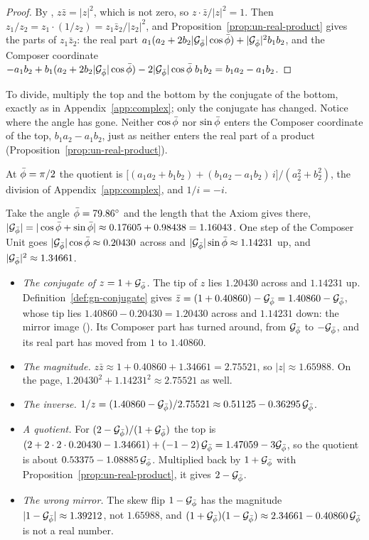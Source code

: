 \begin{proof}
By , $z\bar{z} = |z|^2$, which is not zero, so $z \cdot \bar{z}/|z|^2 = 1$. Then $z_1/z_2 = z_1 \cdot (1/z_2) = z_1\bar{z}_2/|z_2|^2$, and Proposition~\ref{prop:un-real-product} gives the parts of $z_1\bar{z}_2$: the real part $a_1(a_2 + 2b_2|\mathcal{G}_{\bar{\phi}}|\cos\bar{\phi}) + |\mathcal{G}_{\bar{\phi}}|^2 b_1 b_2$, and the Composer coordinate $-a_1b_2 + b_1(a_2 + 2b_2|\mathcal{G}_{\bar{\phi}}|\cos\bar{\phi}) - 2|\mathcal{G}_{\bar{\phi}}|\cos\bar{\phi}\; b_1b_2 = b_1a_2 - a_1b_2$.
\end{proof}

\begin{plainwords}
To divide, multiply the top and the bottom by the conjugate of the bottom, exactly as in Appendix~\ref{app:complex}; only the conjugate has changed. Notice where the angle has gone. Neither $\cos\bar{\phi}$ nor $\sin\bar{\phi}$ enters the Composer coordinate of the top, $b_1a_2 - a_1b_2$, just as neither enters the real part of a product (Proposition~\ref{prop:un-real-product}).
\end{plainwords}

\incomplex At $\bar{\phi} = \pi/2$ the quotient is $\bigl[(a_1a_2 + b_1b_2) + (b_1a_2 - a_1b_2)\,i\bigr]/(a_2^2 + b_2^2)$, the division of Appendix~\ref{app:complex}, and $1/i = -i$.

\begin{workedexample}
Take the angle $\bar{\phi} = 79.86^\circ$ and the length that the Axiom gives there, $|\mathcal{G}_{\bar{\phi}}| = |\cos\bar{\phi} + \sin\bar{\phi}| \approx 0.17605 + 0.98438 = 1.16043$. One step of the Composer Unit goes $|\mathcal{G}_{\bar{\phi}}|\cos\bar{\phi} \approx 0.20430$ across and $|\mathcal{G}_{\bar{\phi}}|\sin\bar{\phi} \approx 1.14231$ up, and $|\mathcal{G}_{\bar{\phi}}|^2 \approx 1.34661$.
\begin{itemize}
  \item \emph{The conjugate of $z = 1 + \mathcal{G}_{\bar{\phi}}$.} The tip of $z$ lies $1.20430$ across and $1.14231$ up. Definition~\ref{def:gn-conjugate} gives $\bar{z} = (1 + 0.40860) - \mathcal{G}_{\bar{\phi}} = 1.40860 - \mathcal{G}_{\bar{\phi}}$, whose tip lies $1.40860 - 0.20430 = 1.20430$ across and $1.14231$ down: the mirror image (). Its Composer part has turned around, from $\mathcal{G}_{\bar{\phi}}$ to $-\mathcal{G}_{\bar{\phi}}$, and its real part has moved from $1$ to $1.40860$.
  \item \emph{The magnitude.} $z\bar{z} \approx 1 + 0.40860 + 1.34661 = 2.75521$, so $|z| \approx 1.65988$. On the page, $1.20430^2 + 1.14231^2 \approx 2.75521$ as well.
  \item \emph{The inverse.} $1/z = (1.40860 - \mathcal{G}_{\bar{\phi}})/2.75521 \approx 0.51125 - 0.36295\,\mathcal{G}_{\bar{\phi}}$.
  \item \emph{A quotient.} For $(2 - \mathcal{G}_{\bar{\phi}})/(1 + \mathcal{G}_{\bar{\phi}})$ the top is $(2 + 2 \cdot 2 \cdot 0.20430 - 1.34661) + (-1 - 2)\,\mathcal{G}_{\bar{\phi}} = 1.47059 - 3\mathcal{G}_{\bar{\phi}}$, so the quotient is about $0.53375 - 1.08885\,\mathcal{G}_{\bar{\phi}}$. Multiplied back by $1 + \mathcal{G}_{\bar{\phi}}$ with Proposition~\ref{prop:un-real-product}, it gives $2 - \mathcal{G}_{\bar{\phi}}$.
  \item \emph{The wrong mirror.} The skew flip $1 - \mathcal{G}_{\bar{\phi}}$ has the magnitude $|1 - \mathcal{G}_{\bar{\phi}}| \approx 1.39212$, not $1.65988$, and $(1 + \mathcal{G}_{\bar{\phi}})(1 - \mathcal{G}_{\bar{\phi}}) \approx 2.34661 - 0.40860\,\mathcal{G}_{\bar{\phi}}$ is not a real number.
\end{itemize}
\end{workedexample}

